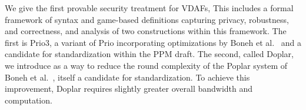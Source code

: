 We give the first provable security treatment for VDAFs, This includes a formal framework of syntax and game-based definitions capturing privacy, robustness, and correctness, and analysis of two constructions within this framework.
The first is Prio3, a variant of Prio incorporating optimizations by Boneh et al.~\cite{BBCG+19} and a candidate for standardization within the PPM draft. The second, called Doplar, we introduce as a way to reduce the round complexity of the Poplar system of Boneh et al.~\cite{BBCG+21},
itself a candidate for standardization. To achieve this improvement, Doplar requires slightly greater overall
bandwidth and computation.
